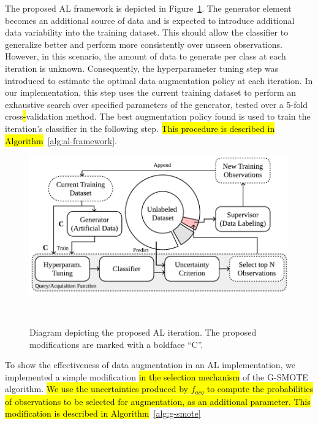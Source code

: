 \documentclass[preprint, 12pt]{elsarticle}
\begin{document}
The proposed\hl{ }AL framework is depicted in Figure~\ref{fig:al_proposed}.
The generator element becomes an additional source of data and is expected to
introduce additional data variability into the training dataset. This should
allow the classifier to generalize better and perform more consistently over
unseen observations. However, in this scenario, the amount of data to generate
per class at each iteration is unknown. Consequently, the hyperparameter
tuning step was introduced to estimate the optimal data augmentation policy at
each iteration. In our implementation, this step uses the current training
dataset to perform an exhaustive search over specified parameters of the
generator, tested over a 5-fold cross\hl{-}validation method. The best
augmentation policy found is used to train the iteration's classifier in the
following step. \hl{This procedure is described in
Algorithm}~\ref{alg:al-framework}.


\begin{figure}[H]
	\centering
	\includegraphics[width=.75\linewidth]{../analysis/al_proposed}
    \caption{%
        Diagram depicting the proposed AL iteration. The proposed
        modifications are marked with a boldface ``C''.
    }~\label{fig:al_proposed}
\end{figure}

To show the effectiveness of data augmentation in an AL implementation, we
implemented a simple modification \hl{in the selection mechanism} of the
G-SMOTE algorithm. \hl{We use the uncertainties produced by $f_{acq}$ to
compute the probabilities of observations to be selected for augmentation, as
an additional parameter. This modification is described in
Algorithm}~\ref{alg:g-smote} 
\end{document}
